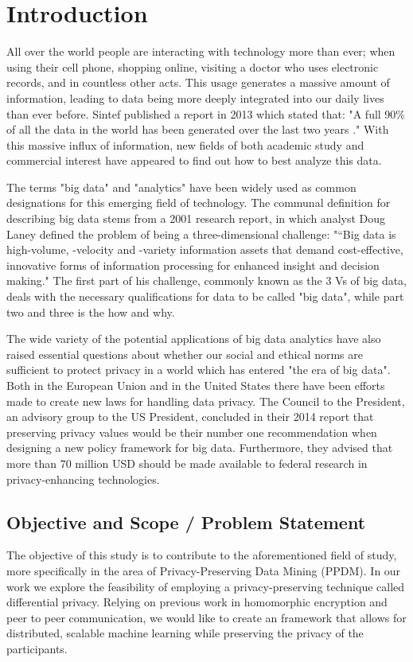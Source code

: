 
\chapter{Introduction}
All over the world people are interacting with technology more than ever; when using their cell phone, shopping online, visiting a doctor who uses electronic records, and in countless other acts. This usage generates a massive amount of information, leading to data being more deeply integrated into our daily lives than ever before. Sintef published a report in 2013 which stated that: "A full 90\% of all the data in the world has been generated over the last two years \citep{dragland2013big}." With this massive influx of information, new fields of both academic study and commercial interest have appeared to find out how to best analyze this data. 

The terms "big data" and "analytics" have been widely used as common designations for this emerging field of technology. The communal definition for describing big data stems from a 2001 research report\citep{laney2001dataVs}, in which analyst Doug Laney defined the problem of being a three-dimensional challenge: "“Big data is high-volume, -velocity and -variety information assets that demand cost-effective, innovative forms of information processing for enhanced insight and decision making." The first part of his challenge, commonly known as the 3 Vs of big data, deals with the necessary qualifications for data to be called "big data", while part two and three is the how and why.  
   
The wide variety of the potential applications of big data analytics have also raised essential questions about whether our social and ethical norms are sufficient to protect privacy in a world which has entered "the era of big data". Both in the European Union and in the United States there have been efforts made to create new laws for handling data privacy. The Council to the President, an advisory group to the US President, concluded in their 2014 report \citep{house2014bigdata} that preserving privacy values would be their number one recommendation when designing a new policy framework for big data. Furthermore, they advised that more than 70 million USD should be made available to federal research in privacy-enhancing technologies. 

\section{Objective and Scope / Problem Statement}
\label{sec:problem_statement}
The objective of this study is to contribute to the aforementioned field of study, more specifically in the area of Privacy-Preserving Data Mining (PPDM). In our work we explore the feasibility  of employing a privacy-preserving technique called differential privacy. Relying on previous work in homomorphic encryption and peer to peer communication, we would like to create an framework that allows for distributed, scalable machine learning while preserving the privacy of the participants. 

